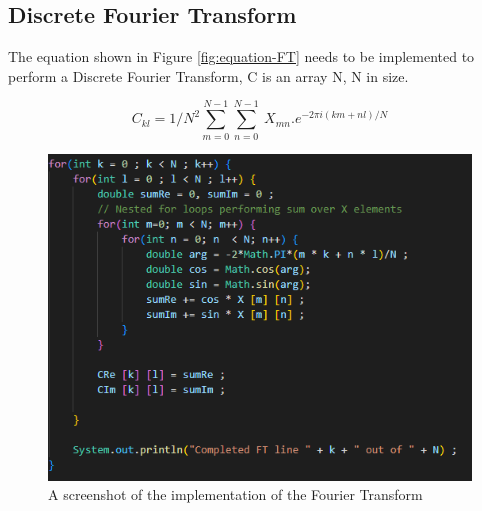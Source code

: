     \subsection{Discrete Fourier Transform}
    The equation shown in Figure \autoref{fig:equation-FT} needs to be implemented to perform a Discrete Fourier Transform, C is an array N, N in size.
    \vspace{15mm}


    \begin{center}
        \begin{equation}
            C_{kl} = 1/N^2 \sum_{m=0}^{N-1} \sum_{n=0}^{N-1}\ X_{mn} . e^{-2\pi i(km+nl)/N}
            \label{fig:equation-FT}
        \end{equation}  
    \end{center}

   
    \begin{figure}[H]
        \centering
        \includegraphics[width=1\columnwidth]{Figures/Week 1/W1-SimpleFT-Completed-For-Loop.png}
        \caption{A screenshot of the implementation of the Fourier Transform}
        \label{fig:wolf-FT-code}
    \end{figure}
    
